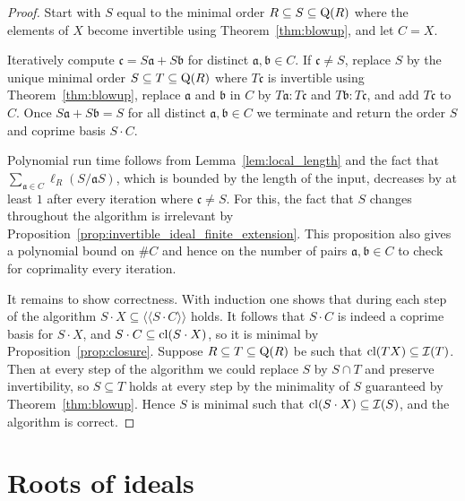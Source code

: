 \documentclass{amsart}
\theoremstyle{plain}
\theoremstyle{definition}
\newcommand{\lla}{\langle\!\langle}
\newcommand{\rra}{\rangle\!\rangle}
\begin{document}
\begin{proof}
Start with \(S\) equal to the minimal order \(R\subseteq S\subseteq\textup{Q}(R)\) where the elements of \(X\) become invertible using Theorem~\ref{thm:blowup}, and let \(C=X\).

Iteratively compute \(\mathfrak{c}=S\mathfrak{a}+S\mathfrak{b}\) for distinct \(\mathfrak{a},\mathfrak{b}\in C\). 
If \(\mathfrak{c}\neq S\), replace \(S\) by the unique minimal order \(S\subseteq T\subseteq \textup{Q}(R)\)  where \(T\mathfrak{c}\) is invertible using Theorem~\ref{thm:blowup}, replace \(\mathfrak{a}\) and \(\mathfrak{b}\) in \(C\) by \(T\mathfrak{a}: T\mathfrak{c}\) and \(T\mathfrak{b}:T\mathfrak{c}\), and add \(T\mathfrak{c}\) to \(C\).
Once \(S\mathfrak{a}+S\mathfrak{b}=S\) for all distinct \(\mathfrak{a},\mathfrak{b}\in C\) we terminate and return the order \(S\) and coprime basis \(S\cdot C\).

Polynomial run time follows from Lemma~\ref{lem:local_length} and the fact that \(\sum_{\mathfrak{a}\in C} \ell_R(S/\mathfrak{a}S)\), which is bounded by the length of the input, decreases by at least \(1\) after every iteration where \(\mathfrak{c}\neq S\). 
For this, the fact that \(S\) changes throughout the algorithm is irrelevant by Proposition~\ref{prop:invertible_ideal_finite_extension}. 
This proposition also gives a polynomial bound on \(\# C\) and hence on the number of pairs \(\mathfrak{a},\mathfrak{b}\in C\) to check for coprimality every iteration.

It remains to show correctness. 
With induction one shows that during each step of the algorithm \(S\cdot X\subseteq\lla S\cdot C\rra\) holds.
It follows that \(S\cdot C\) is indeed a coprime basis for \(S\cdot X\), and \(S\cdot C\subseteq\textup{cl}(S\cdot X)\), so it is minimal by Proposition~\ref{prop:closure}.
Suppose \(R\subseteq T\subseteq\textup{Q}(R)\) be such that \(\textup{cl}(TX)\subseteq\mathcal{I}(T)\).
Then at every step of the algorithm we could replace \(S\) by \(S\cap T\) and preserve invertibility, so \(S\subseteq T\) holds at every step by the minimality of \(S\) guaranteed by Theorem~\ref{thm:blowup}.
Hence \(S\) is minimal such that \(\textup{cl}(S\cdot X)\subseteq\mathcal{I}(S)\), and the algorithm is correct.
\end{proof}


\section{Roots of ideals}
\end{document}
